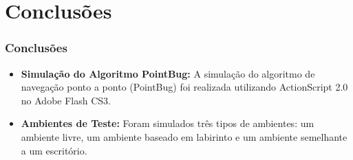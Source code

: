 \documentclass[xcolor=dvipsnames, aspectratio=169]{beamer}
\begin{document}
  

\section{Conclusões}
\begin{frame}
  \frametitle{Conclusões}
  \begin{itemize}
    \item \textbf{Simulação do Algoritmo PointBug:} A simulação do algoritmo de navegação ponto a ponto (PointBug) foi realizada utilizando ActionScript 2.0 no Adobe Flash CS3.
    \item \textbf{Ambientes de Teste:} Foram simulados três tipos de ambientes: um ambiente livre, um ambiente baseado em labirinto e um ambiente semelhante a um escritório.
  \end{itemize}
\end{frame}

\begin{frame}
    \printbibliography
\end{frame}


\begin{frame}
\titlepage %
\end{frame}
\end{document}
